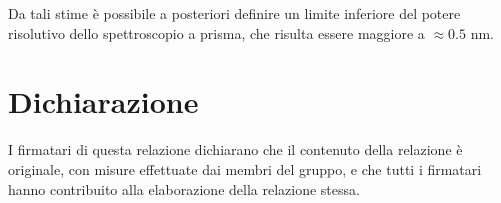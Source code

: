 \documentclass[10pt,a4paper]{article}
\begin{document}
\noindent Da tali stime \`e possibile a posteriori definire un limite inferiore del potere risolutivo dello spettroscopio a prisma, che risulta essere maggiore a $\approx0.5$ nm.




















\section*{Dichiarazione}
I firmatari di questa relazione dichiarano che il contenuto della relazione \`e originale, con misure effettuate dai membri del gruppo, e che tutti i firmatari hanno contribuito alla elaborazione della relazione stessa.
\end{document}
